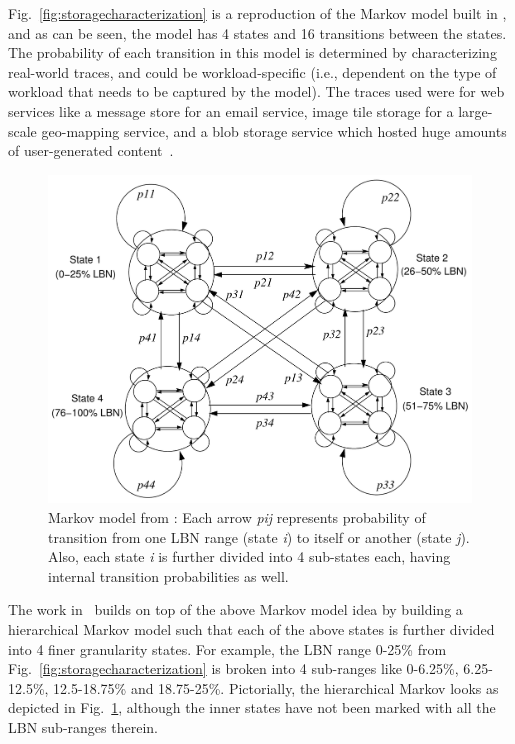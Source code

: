 Fig.~\ref{fig:storagecharacterization} is a reproduction of
the Markov model built in \cite{storagecharacterization}, and as
can be seen, the model has 4 states and 16 transitions between
the states. The probability of each transition in this model
is determined by characterizing real-world traces, and could
be workload-specific (i.e., dependent on the type of workload
that needs to be captured by the model). The traces used were
for web services like a message store for an email service, 
image tile storage for a large-scale geo-mapping service, and 
a blob storage service which hosted huge amounts of user-generated
content~\cite{storagecharacterization}.

\begin{figure}[t]
	\centering
	\includegraphics[scale=0.5]{presyn-figures/decoupling-dc-studies.pdf}
	\caption{Markov model from \cite{decoupling-dc-studies}: Each arrow \textit{pij} represents 
		probability of transition from one LBN
	range (state \textit{i}) to itself or another (state \textit{j}). Also, each state \textit{i}
	is further divided into 4 sub-states each, having internal transition probabilities as well.}
	\label{fig:decoupling-dc-studies}
\end{figure}


The work in~\cite{storagereplay, storagemodeling, decoupling-dc-studies}
builds on top of the above Markov model idea by building a hierarchical
Markov model such that each of the above states is further divided 
into 4 finer granularity states. For example, the LBN range
0-25\% from Fig.~\ref{fig:storagecharacterization} is broken
into 4 sub-ranges like 0-6.25\%, 6.25-12.5\%, 12.5-18.75\% 
and 18.75-25\%. Pictorially, the hierarchical Markov looks as
depicted in Fig.~\ref{fig:decoupling-dc-studies}, although
the inner states have not been marked with all the LBN sub-ranges therein.


